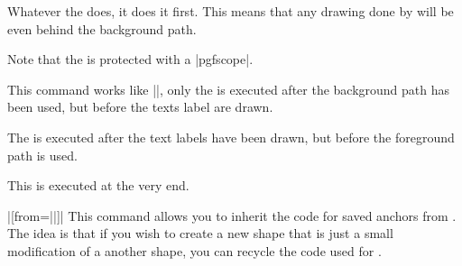 \begin{command}{\pgfdeclareshape{}}
\begin{command}{\behindbackgroundpath{}}
        Whatever the  does, it does it first. This means that any
        drawing done by  will be even behind the background path.

        Note that the  is protected with a |{pgfscope}|.
    \end{command}
    \begin{command}{\beforebackgroundpath{}}
        This command works like |\behindbackgroundpath|, only the 
        is executed after the background path has been used, but before the
        texts label are drawn.
    \end{command}
    \begin{command}{\behindforegroundpath{}}
        The  is executed after the text labels have been drawn, but
        before the foreground path is used.
    \end{command}
    \begin{command}{\beforeforegroundpath{}}
        This  is executed at the very end.
    \end{command}
    \begin{command}{\inheritsavedanchors|[from=||]|}
        This command allows you to inherit the code for saved anchors from
        . The idea is that if you wish to create a new
        shape that is just a small modification of a another shape, you can
        recycle the code used for .


\end{command}
\end{command}
